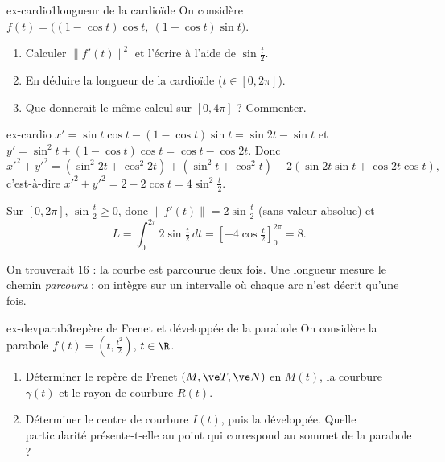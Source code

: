 
\begin{exo}{ex-cardio}{1}{longueur de la cardioïde}
On considère $f(t)=\big((1-\cos t)\cos t,\ (1-\cos t)\sin t\big)$.
\begin{enumerate}
\item Calculer $\|f'(t)\|^2$ et l'écrire à l'aide de $\sin\frac t2$.
\item En déduire la longueur de la cardioïde ($t\in[0,2\pi]$).
\item Que donnerait le même calcul sur $[0,4\pi]$ ? Commenter.
\end{enumerate}
\end{exo}

\begin{corrige}{ex-cardio}
 $x'=\sin t\cos t-(1-\cos t)\sin t=\sin2t-\sin t$ et $y'=\sin^2t+(1-\cos t)\cos t=\cos t-\cos2t$. Donc
\[x'^2+y'^2=(\sin^2 2t+\cos^2 2t)+(\sin^2t+\cos^2t)-2(\sin2t\sin t+\cos2t\cos t),\]
c'est-à-dire $x'^2+y'^2=2-2\cos t=4\sin^2\frac t2$.

 Sur $[0,2\pi]$, $\sin\frac t2\geq0$, donc $\|f'(t)\|=2\sin\frac t2$ (sans valeur absolue) et
\[L=\int_0^{2\pi}2\sin\tfrac t2\,dt=\left[-4\cos\tfrac t2\right]_0^{2\pi}=8.\]

 On trouverait $16$ : la courbe est parcourue deux fois. Une longueur mesure le chemin \emph{parcouru} ; on intègre sur un intervalle où chaque arc n'est décrit qu'une fois.
\end{corrige}

\begin{exo}{ex-devparab}{3}{repère de Frenet et développée de la parabole}
On considère la parabole $f(t)=\left(t,\frac{t^2}2\right)$, $t\in\R$.
\begin{enumerate}
\item Déterminer le repère de Frenet $(M,\ve T,\ve N)$ en $M(t)$, la courbure $\gamma(t)$ et le rayon de courbure $R(t)$.
\item Déterminer le centre de courbure $I(t)$, puis la développée. Quelle particularité présente-t-elle au point qui correspond au sommet de la parabole ?
\end{enumerate}
\end{exo}

